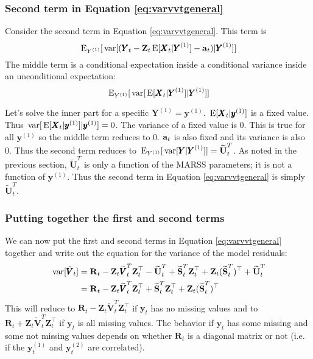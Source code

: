 \documentclass[]{article}
\def\XI{\mbox{\boldmath $\Xi$}}
\def\E{\,\textup{\textrm{E}}}
\def\RR{\mbox{$\mathbf R$}}	 \def\rr{\mbox{$\mathbf r$}} \def\Rb{\mbox{$\mathbf H$}}	\def\Rm{\mathbb{R}}
\def\Ss{\mbox{$\mathbf S$}}
\def\UU{\mbox{$\mathbf U$}}	\def\uu{\mbox{$\mathbf u$}}
\def\VV{\mbox{$\pmb{V}$}}	\def\vv{\mbox{$\pmb{v}$}}
\def\XX{\mbox{$\pmb{X}$}}	\def\xx{\mbox{$\pmb{x}$}}
\def\YY{\mbox{$\pmb{Y}$}}	\def\yy{\mbox{$\pmb{y}$}}
\def\ZZ{\mbox{$\mathbf Z$}}	\def\zz{\mbox{$\mathbf z$}}	\def\Zb{\mbox{$\mathbf M$}} \def\Za{\mbox{$\mathbf N$}} \def\Zm{\XI}
\def\var{\,\textup{\textrm{var}}}
\def\hatVt{\widetilde{\VV}_t^T}
\def\hatUt{\widetilde{\UU}_t^T}
\def\hatSt{\widetilde{\Ss}_t^T}
\begin{document}
\subsubsection{Second term in Equation \ref{eq:varvvtgeneral}}

Consider the second term in Equation \ref{eq:varvvtgeneral}.  This term is 
\begin{equation}
\E_{Y^{(1)}}[\var[(\YY_t-\ZZ_t\E[\XX_t|\YY^{(1)}]-\aa_t)|\YY^{(1)}]]
\end{equation}
The middle term is a conditional expectation inside a conditional variance inside an unconditional expectation:
\begin{equation}
\E_{Y^{(1)}}[\var[\E[\XX_t|\YY^{(1)}]|\YY^{(1)}]]
\end{equation}

Let's solve the inner part for a specific $\YY^{(1)}=\yy^{(1)}$. $\E[\XX_t|\yy^{(1)}]$ is a fixed value. Thus  $\var[\E[\XX_t|\yy^{(1)}]|\yy^{(1)}]=0$. The variance of a fixed value is 0. This is true for all $\yy^{(1)}$ so the middle term reduces to 0. $\aa_t$ is also fixed and its variance is also 0. Thus the second term reduces to $\E_{Y^{(1)}}[\var[\YY|\YY^{(1)}]] = \hatUt$. As noted in the previous section, $\hatUt$ is only a function of the MARSS parameters; it is not a function of $\yy^{(1)}$. Thus the second term in Equation \ref{eq:varvvtgeneral} is simply $\hatUt$.

\subsubsection{Putting together the first and second terms}
We can now put the first and second terms in Equation \ref{eq:varvvtgeneral} together and write out the equation for the variance of the model residuals:
\begin{equation}
\begin{split}
\var[\hat{\VV}_t] &= \RR_t - \ZZ_t \hatVt \ZZ_t^\top - \hatUt + \hatSt\ZZ_t^\top + \ZZ_t(\hatSt)^\top + \hatUt\\
&= \RR_t - \ZZ_t \hatVt \ZZ_t^\top + \hatSt\ZZ_t^\top + \ZZ_t(\hatSt)^\top
\end{split}
\end{equation}
This will reduce to $\RR_t - \ZZ_t \hatVt \ZZ_t^\top$ if $\yy_t$ has no missing values and to $\RR_t + \ZZ_t \hatVt \ZZ_t^\top$ if $\yy_t$ is all missing values. The behavior if $\yy_t$ has some missing and some not missing values depends on whether $\RR_t$ is a diagonal matrix or not (i.e. if the $\yy_t^{(1)}$ and $\yy_t^{(2)}$ are correlated).
\end{document}
